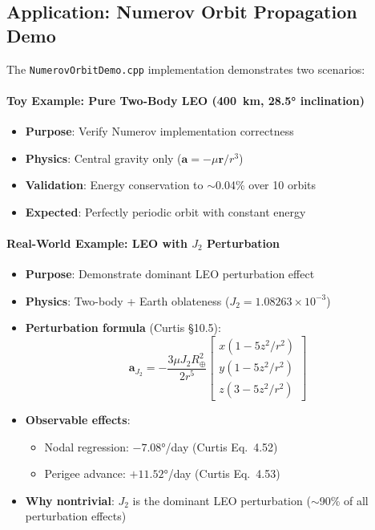 \documentclass[11pt]{article}
\begin{document}
\subsection{Application: Numerov Orbit Propagation Demo}
\label{ssec:numerov-demo}

The \texttt{NumerovOrbitDemo.cpp} implementation demonstrates two scenarios:

\paragraph{Toy Example: Pure Two-Body LEO (400~km, 28.5° inclination)}
\begin{itemize}
\item \textbf{Purpose}: Verify Numerov implementation correctness
\item \textbf{Physics}: Central gravity only ($\mathbf{a} = -\mu\mathbf{r}/r^3$)
\item \textbf{Validation}: Energy conservation to $\sim$0.04\% over 10 orbits
\item \textbf{Expected}: Perfectly periodic orbit with constant energy
\end{itemize}

\paragraph{Real-World Example: LEO with $J_2$ Perturbation}
\begin{itemize}
\item \textbf{Purpose}: Demonstrate dominant LEO perturbation effect
\item \textbf{Physics}: Two-body + Earth oblateness ($J_2 = 1.08263 \times 10^{-3}$)
\item \textbf{Perturbation formula} (Curtis \S10.5):
\begin{equation}
\mathbf{a}_{J_2} = -\frac{3\mu J_2 R_\oplus^2}{2r^5}
\begin{bmatrix}
x(1 - 5z^2/r^2) \\
y(1 - 5z^2/r^2) \\
z(3 - 5z^2/r^2)
\end{bmatrix}
\end{equation}
\item \textbf{Observable effects}:
  \begin{itemize}
  \item Nodal regression: $-7.08°$/day (Curtis Eq.~4.52)
  \item Perigee advance: $+11.52°$/day (Curtis Eq.~4.53)
  \end{itemize}
\item \textbf{Why nontrivial}: $J_2$ is the dominant LEO perturbation ($\sim$90\% of all perturbation effects)
\end{itemize}
\end{document}
